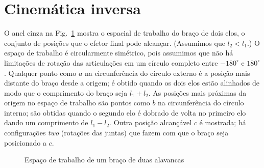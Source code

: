 \section{Cinemática inversa}\label{s.inverse-kinematics}

O anel cinza na Fig.~\ref{fig.workspace} mostra o {espacial de trabalho} do braço de dois elos, o conjunto de posições que o efetor final pode alcançar. (Assumimos que $l_2<l_1$.) O espaço de trabalho é circularmente simétrico, pois assumimos que não há limitações de rotação das articulações em um círculo completo entre $-180^{\circ}$ e $180^{\circ}$. Qualquer ponto como $a$ na circunferência do círculo externo é a posição mais distante do braço desde a origem; é obtido quando os dois elos estão alinhados de modo que o comprimento do braço seja $l_1+l_2$. As posições mais próximas da origem no espaço de trabalho são pontos como $b$ na circunferência do círculo interno; são obtidas quando o segundo elo é dobrado de volta no primeiro elo dando um comprimento de $l_1-l_2$. Outra posição alcançável $c$ é mostrada; há configurações \emph{two} (rotações das juntas) que fazem com que o braço seja posicionado a $c$.

\begin{figure}
\begin{center}
\end{center}
\caption{Espaço de trabalho de um braço de duas alavancas}\label{fig.workspace}
\end{figure}


